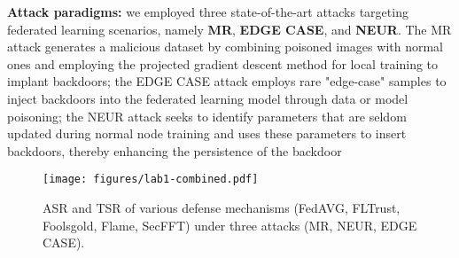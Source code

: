 \documentclass[lettersize,journal]{IEEEtran}
\begin{document}
\textbf{Attack paradigms:} we employed three state-of-the-art attacks targeting federated learning scenarios, namely \textbf{MR}\cite{MR}, \textbf{EDGE CASE}\cite{EDGE_CASE}, and \textbf{NEUR}\cite{zhang2022neurotoxin}. The MR attack generates a malicious dataset by combining poisoned images with normal ones and employing the projected gradient descent method for local training to implant backdoors; the EDGE CASE attack employs rare "edge-case" samples to inject backdoors into the federated learning model through data or model poisoning; the NEUR attack seeks to identify parameters that are seldom updated during normal node training and uses these parameters to insert backdoors, thereby enhancing the persistence of the backdoor\color{black}{.}

\begin{figure*}[!ht]
    \centering
    \texttt{[image: figures/lab1-combined.pdf]}
    \caption{ASR and TSR of various defense mechanisms (FedAVG, FLTrust, Foolsgold, Flame, SecFFT) under three attacks (MR, NEUR, EDGE CASE).}
    \label{fig:lab1}
\end{figure*}
\end{document}
